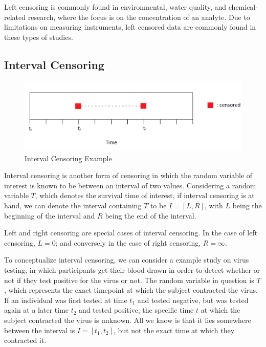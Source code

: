 \documentclass[12pt, twoside]{amherstthesis}
\begin{document}
Left censoring is commonly found in environmental, water quality, and chemical-related research, where the focus is on the concentration of an analyte. Due to limitations on measuring instruments, left censored data are commonly found in these types of studies.

\hypertarget{interval}{%
\subsection{Interval Censoring}\label{interval}}
\begin{figure}

{\centering \includegraphics[width=1\linewidth]{figures/interval_censoring_example_fix} 

}

\caption{Interval Censoring Example}\label{fig:intervalcensoringexample}
\end{figure}
Interval censoring is another form of censoring in which the random variable of interest is known to be between an interval of two values. Considering a random variable \(T\), which denotes the survival time of interest, if interval censoring is at hand, we can denote the interval containing \(T\) to be \(I = [L, R]\), with \(L\) being the beginning of the interval and \(R\) being the end of the interval.

Left and right censoring are special cases of interval censoring. In the case of left censoring, \(L = 0\); and conversely in the case of right censoring, \(R = \infty\).

To conceptualize interval censoring, we can consider a example study on virus testing, in which participants get their blood drawn in order to detect whether or not if they test positive for the virus or not. The random variable in question is \(T\), which represents the exact timepoint at which the subject contracted the virus. If an individual was first tested at time \(t_1\) and tested negative, but was tested again at a later time \(t_2\) and tested positive, the specific time \(t\) at which the subject contracted the virus is unknown. All we know is that it lies somewhere between the interval is \(I = [t_1, t_2]\), but not the exact time at which they contracted it.
\end{document}

